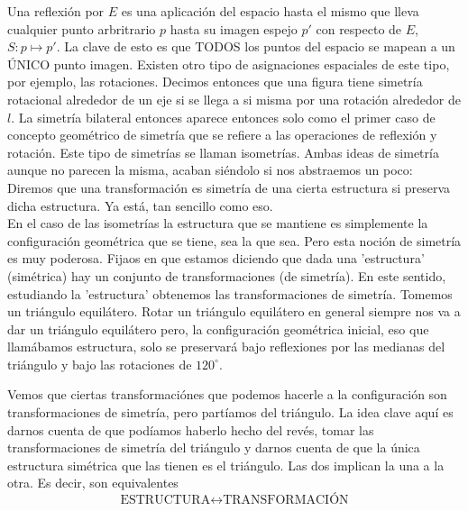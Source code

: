 \documentclass[12pt]{article}
\begin{document}
Una reflexión por $E$ es una aplicación del espacio hasta el mismo  que lleva cualquier punto arbritrario $p$ hasta su imagen espejo $p'$ con respecto de $E$, $S:p\mapsto p'$. La clave de esto es que TODOS los puntos del espacio se mapean a un ÚNICO punto imagen. Existen otro tipo de asignaciones espaciales de este tipo, por ejemplo, las rotaciones. Decimos entonces que una figura tiene simetría rotacional alrededor de un eje si se llega a si misma por una rotación alrededor de $l$. La simetría bilateral entonces aparece entonces solo como el primer caso de concepto geométrico de simetría que se refiere a las operaciones de reflexión y rotación.
Este tipo de simetrías se llaman isometrías. Ambas ideas de simetría aunque no parecen la misma, acaban siéndolo si nos abstraemos un poco:\\  Diremos que una transformación es simetría de una cierta estructura si preserva dicha estructura. Ya está, tan sencillo como eso.\\ En el caso de las isometrías la estructura que se mantiene es simplemente la configuración geométrica que se tiene, sea la que sea. Pero esta noción de simetría es muy poderosa. Fijaos en que estamos diciendo que dada una 'estructura' (simétrica) hay un conjunto de transformaciones (de simetría). En este sentido, estudiando la 'estructura' obtenemos las transformaciones de simetría.  Tomemos un triángulo equilátero.  Rotar un triángulo equilátero en general siempre nos va a dar un triángulo equilátero pero, la configuración geométrica inicial, eso que llamábamos estructura, solo se preservará bajo reflexiones por las medianas del triángulo y bajo las rotaciones de $120^\circ$. 
\begin{center}
\end{center} 
 Vemos que ciertas transformaciónes que podemos hacerle a la configuración son transformaciones de simetría, pero partíamos del triángulo. La idea clave aquí es darnos cuenta de que podíamos haberlo hecho del revés, tomar las transformaciones de simetría del triángulo y darnos cuenta de que la única estructura simétrica que las tienen es el triángulo. Las dos implican la una a la otra.  Es decir, son equivalentes
 $$\text{ESTRUCTURA}\longleftrightarrow \text{TRANSFORMACIÓN}$$
\end{document}
